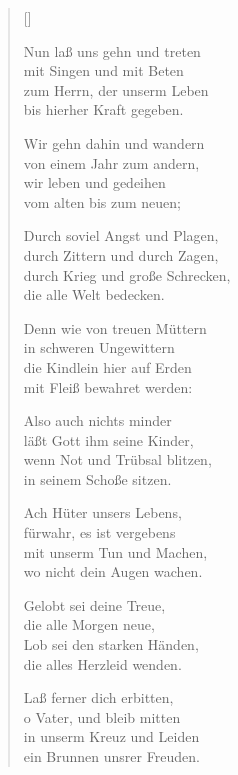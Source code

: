 \begin{multicols}{2}
\settowidth{\versewidth}{Durch soviel Angst und Plagen,}
\begin{verse}[\versewidth]
 
 Nun laß uns gehn und treten\\
mit Singen und mit Beten\\
zum Herrn, der unserm Leben\\
bis hierher Kraft gegeben.
 
 Wir gehn dahin und wandern\\
von einem Jahr zum andern,\\
wir leben und gedeihen\\
vom alten bis zum neuen;
 
 Durch soviel Angst und Plagen,\\
durch Zittern und durch Zagen,\\
durch Krieg und große Schrecken,\\
die alle Welt bedecken.
 
 Denn wie von treuen Müttern\\
in schweren Ungewittern\\
die Kindlein hier auf Erden\\
mit Fleiß bewahret werden:
 
 Also auch nichts minder\\
läßt Gott ihm seine Kinder,\\
wenn Not und Trübsal blitzen,\\
in seinem Schoße sitzen.
 
 Ach Hüter unsers Lebens,\\
fürwahr, es ist vergebens\\
mit unserm Tun und Machen,\\
wo nicht dein Augen wachen.
 
 Gelobt sei deine Treue,\\
die alle Morgen neue,\\
Lob sei den starken Händen,\\
die alles Herzleid wenden.
 
 Laß ferner dich erbitten,\\
o Vater, und bleib mitten\\
in unserm Kreuz und Leiden\\
ein Brunnen unsrer Freuden.
 

\end{verse}
\end{multicols}
